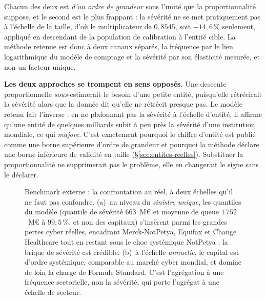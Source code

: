 \vspace{4pt}
\noindent Chacun des deux est \emph{d'un ordre de grandeur} sous l'unité que la proportionnalité
suppose, et le second est le plus frappant : la sévérité ne se met pratiquement pas à l'échelle
de la taille, d'où le multiplicateur de $0{,}8545$, soit $-14{,}6\,\%$ seulement, appliqué en
descendant de la population de calibration à l'entité cible. La méthode retenue est donc
à deux canaux séparés, la fréquence par le lien logarithmique du modèle de comptage et
la sévérité par son élasticité mesurée, et non un facteur unique.

\begin{attention}
\textbf{Les deux approches se trompent en sens opposés.} Une descente proportionnelle \emph{sous}-estimerait le besoin d'une petite entité,
puisqu'elle rétrécirait la sévérité alors que la donnée dit qu'elle ne rétrécit presque pas. Le
modèle retenu fait l'inverse : en ne plafonnant pas la sévérité à l'échelle d'entité, il affirme
qu'une entité de quelques milliards subit à peu près la sévérité d'une institution mondiale, ce
qui \emph{majore}. C'est exactement pourquoi le chiffre d'entité est publié comme une
borne supérieure d'ordre de grandeur et pourquoi la méthode déclare une borne inférieure
de validité en taille (\S\ref{sec:entites-reelles}). Substituer la proportionnalité ne
supprimerait pas le problème, elle en changerait le signe sans le déclarer.
\end{attention}

\begin{figure}[htbp]\centering
{}
\caption{Benchmark externe : la confrontation au réel, à deux échelles
qu'il ne faut pas confondre. (a)~au niveau du \emph{sinistre unique}, les quantiles du modèle
(quantile de sévérité $663$~M\euro{} et moyenne de queue $1\,752$~M\euro{} à $99{,}5\,\%$, et non
des capitaux) s'insèrent parmi les grandes pertes
cyber réelles, encadrant Merck-NotPetya, Equifax et Change Healthcare tout en restant sous le
choc systémique NotPetya : la brique de sévérité est crédible. (b)~à l'échelle
\emph{annuelle}, le capital est d'ordre systémique, comparable au marché cyber mondial, et
domine de loin la charge de Formule Standard. C'est l'agrégation à une fréquence sectorielle,
non la sévérité, qui porte l'agrégat à une échelle de secteur.}
\label{fig:benchmark-externe}
\end{figure}

